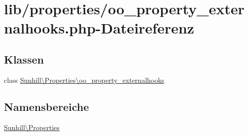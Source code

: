 \hypertarget{oo__property__externalhooks_8php}{}\section{lib/properties/oo\+\_\+property\+\_\+externalhooks.php-\/\+Dateireferenz}
\label{oo__property__externalhooks_8php}
\subsection*{Klassen}
\begin{DoxyCompactItemize}
\item 
class \hyperlink{classSunhill_1_1Properties_1_1oo__property__externalhooks}{Sunhill\textbackslash{}\+Properties\textbackslash{}oo\+\_\+property\+\_\+externalhooks}
\end{DoxyCompactItemize}
\subsection*{Namensbereiche}
\begin{DoxyCompactItemize}
\item 
 \hyperlink{namespaceSunhill_1_1Properties}{Sunhill\textbackslash{}\+Properties}
\end{DoxyCompactItemize}
